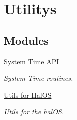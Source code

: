 \hypertarget{group___u_t_i_l}{
\section{Utilitys}
\label{group___u_t_i_l}
}
\subsection*{Modules}
\begin{CompactItemize}
\item 
\hyperlink{group___t_i_m_e_a_p_i}{System Time API}
\begin{CompactList}\small\item\em System Time routines. \item\end{CompactList}

\item 
\hyperlink{group___u_t_i_l_i_t_y_s}{Utils for HalOS}
\begin{CompactList}\small\item\em Utils for the halOS. \item\end{CompactList}

\end{CompactItemize}
